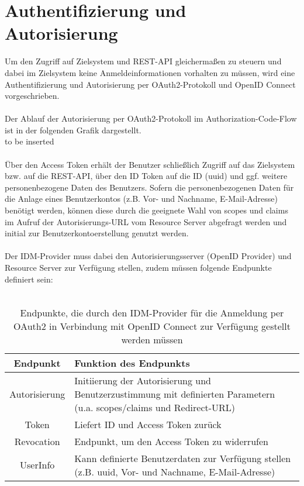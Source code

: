 \chapter{Authentifizierung und Autorisierung}
Um den Zugriff auf Zielsystem und REST-API gleichermaßen zu steuern und dabei im Zielsystem keine Anmeldeinformationen vorhalten zu müssen, wird eine Authentifizierung und Autorisierung per OAuth2-Protokoll und OpenID Connect vorgeschrieben.\\
\\
Der Ablauf der Autorisierung per OAuth2-Protokoll im Authorization-Code-Flow ist in der folgenden Grafik dargestellt. 
\\
to be inserted\\
\\
Über den Access Token erhält der Benutzer schließlich Zugriff auf das Zielsystem bzw. auf die REST-API, über den ID Token auf die ID (uuid) und ggf. weitere personenbezogene Daten des Benutzers. 
Sofern die personenbezogenen Daten für die Anlage eines Benutzerkontos (z.B. Vor- und Nachname, E-Mail-Adresse) benötigt werden, können diese durch die geeignete Wahl von scopes und claims im Aufruf der Autorisierungs-URL vom Resource Server abgefragt werden und initial zur Benutzerkontoerstellung genutzt werden.\\
\\
Der IDM-Provider muss dabei den Autorisierungsserver (OpenID Provider) und Resource Server zur Verfügung stellen, zudem müssen folgende Endpunkte definiert sein:\\
\\
\begin{table}[htb]
    \begin{tabularx}{\textwidth}{|c|X|}
        \hline
\textbf{Endpunkt} & \textbf{Funktion des Endpunkts} \\ \hline
Autorisierung & Initiierung der Autorisierung und Benutzerzustimmung mit definierten Parametern (u.a. scopes/claims und Redirect-URL) \\ \hline
Token & Liefert ID und Access Token zurück \\ \hline
Revocation & Endpunkt, um den Access Token zu widerrufen \\ \hline
UserInfo & Kann definierte Benutzerdaten zur Verfügung stellen (z.B. uuid, Vor- und Nachname, E-Mail-Adresse) \\ \hline
    \end{tabularx}

        \caption{Endpunkte, die durch den IDM-Provider für die Anmeldung per OAuth2 in Verbindung mit OpenID Connect zur Verfügung gestellt werden müssen}
        \label{tab:auth:endpoints}
\end{table}
